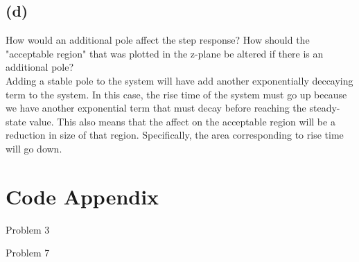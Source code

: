 \documentclass{article}
\begin{document}
\subsection*{(d)}
How would an additional pole affect the step response? How should the "acceptable region" that was plotted in the z-plane be altered if there is an additional pole?\\

Adding a stable pole to the system will have add another exponentially deccaying term to the system. In this case, the rise time of the system must go up because we have another exponential term that must decay before reaching the steady-state value. This also means that the affect on the acceptable region will be a reduction in size of that region. Specifically, the area corresponding to rise time will go down.

\appendix
\section*{Code Appendix}
Problem 3

Problem 7

\end{document}
